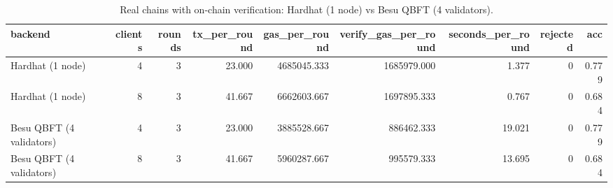 \begin{table}
\caption{Real chains with on-chain verification: Hardhat (1 node) vs Besu QBFT (4 validators).}
\label{tab:T09_chain_backends}
\begin{tabular}{lrrrrrrrr}
\toprule
backend & clients & rounds & tx\_per\_round & gas\_per\_round & verify\_gas\_per\_round & seconds\_per\_round & rejected & acc \\
\midrule
Hardhat (1 node) & 4 & 3 & 23.000 & 4685045.333 & 1685979.000 & 1.377 & 0 & 0.779 \\
Hardhat (1 node) & 8 & 3 & 41.667 & 6662603.667 & 1697895.333 & 0.767 & 0 & 0.684 \\
Besu QBFT (4 validators) & 4 & 3 & 23.000 & 3885528.667 & 886462.333 & 19.021 & 0 & 0.779 \\
Besu QBFT (4 validators) & 8 & 3 & 41.667 & 5960287.667 & 995579.333 & 13.695 & 0 & 0.684 \\
\bottomrule
\end{tabular}
\end{table}
